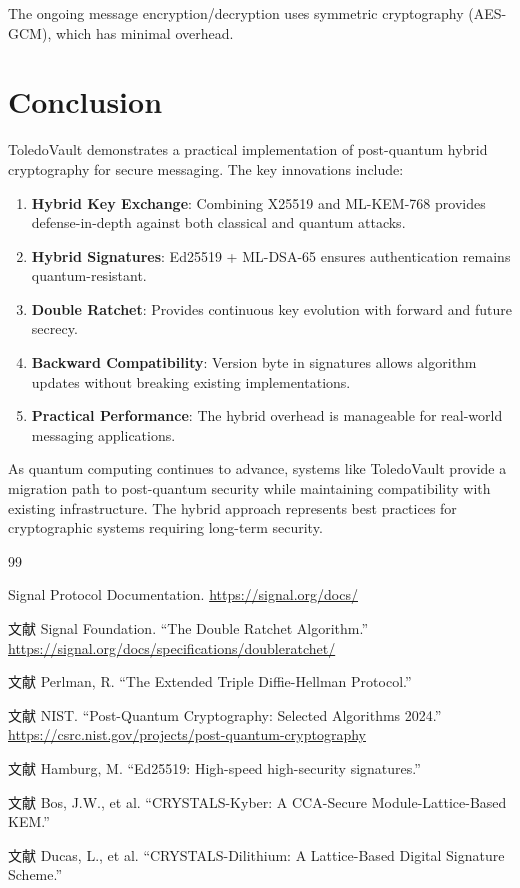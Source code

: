 \documentclass[12pt,a4paper]{article}
\begin{document}
The ongoing message encryption/decryption uses symmetric cryptography (AES-GCM), which has minimal overhead.

\section{Conclusion}

ToledoVault demonstrates a practical implementation of post-quantum hybrid cryptography for secure messaging. The key innovations include:

\begin{enumerate}
    \item \textbf{Hybrid Key Exchange}: Combining X25519 and ML-KEM-768 provides defense-in-depth against both classical and quantum attacks.
    \item \textbf{Hybrid Signatures}: Ed25519 + ML-DSA-65 ensures authentication remains quantum-resistant.
    \item \textbf{Double Ratchet}: Provides continuous key evolution with forward and future secrecy.
    \item \textbf{Backward Compatibility}: Version byte in signatures allows algorithm updates without breaking existing implementations.
    \item \textbf{Practical Performance}: The hybrid overhead is manageable for real-world messaging applications.
\end{enumerate}

As quantum computing continues to advance, systems like ToledoVault provide a migration path to post-quantum security while maintaining compatibility with existing infrastructure. The hybrid approach represents best practices for cryptographic systems requiring long-term security.

\begin{thebibliography}{99}

Signal Protocol Documentation. \url{https://signal.org/docs/}

文献
Signal Foundation. ``The Double Ratchet Algorithm.'' \url{https://signal.org/docs/specifications/doubleratchet/}

文献
Perlman, R. ``The Extended Triple Diffie-Hellman Protocol.''

文献
NIST. ``Post-Quantum Cryptography: Selected Algorithms 2024.'' \url{https://csrc.nist.gov/projects/post-quantum-cryptography}

文献
Hamburg, M. ``Ed25519: High-speed high-security signatures.''

文献
Bos, J.W., et al. ``CRYSTALS-Kyber: A CCA-Secure Module-Lattice-Based KEM.''

文献
Ducas, L., et al. ``CRYSTALS-Dilithium: A Lattice-Based Digital Signature Scheme.''

\end{thebibliography}
\end{document}
